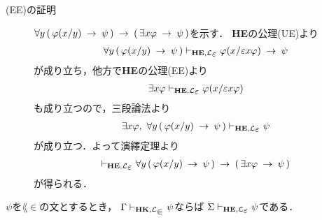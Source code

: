 \begin{metaprf}
\begin{description}
\begin{description}
					\item[(EE)の証明]
						$\forall y\, (\, \varphi(x/y) \hspace{0.25em}\rightarrow\hspace{0.25em} \psi\, ) 
						\hspace{0.25em}\rightarrow\hspace{0.25em} (\, \exists x \varphi \hspace{0.25em}\rightarrow\hspace{0.25em} \psi\, )$を示す．
						{\bf HE}の公理(UE)より
						\begin{align}
							\forall y\, (\, \varphi(x/y) \rarrow \psi\, ) \provable{\mbox{{\bf HE}},\lang{\varepsilon}}
							\varphi(x/\varepsilon x \varphi) \rarrow \psi
						\end{align}
						が成り立ち，他方で{\bf HE}の公理(EE)より
						\begin{align}
							\exists x \varphi \provable{\mbox{{\bf HE}},\lang{\varepsilon}} \varphi(x/\varepsilon x \varphi)
						\end{align}
						も成り立つので，三段論法より
						\begin{align}
							\exists x \varphi,\ \forall y\, (\, \varphi(x/y) \rarrow \psi\, ) \provable{\mbox{{\bf HE}},\lang{\varepsilon}} \psi
						\end{align}
						が成り立つ．よって演繹定理より
						\begin{align}
							\provable{\mbox{{\bf HE}},\lang{\varepsilon}} \forall y\, (\, \varphi(x/y) \rarrow \psi\, ) 
							\rarrow (\, \exists x \varphi \rarrow \psi\, )
						\end{align}
						が得られる．
						\QED
				\end{description}
		\end{description}
	\end{metaprf}
	
	\begin{screen}
		\begin{metathm}
			$\psi$を$\lang{\in}$の文とするとき，
			$\Gamma \provable{\mbox{{\bf HK}},\lang{\in}} \psi$ならば
			$\Sigma \provable{\mbox{{\bf HE}},\lang{\varepsilon}} \psi$である．
		\end{metathm}
	\end{screen}
	
